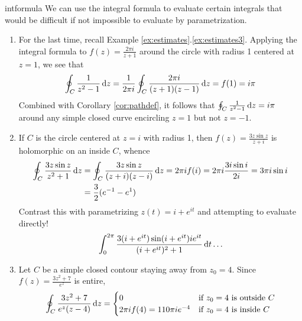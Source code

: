 \goodbreak






\begin{examples}{}{intformula}
	We can use the integral formula to evaluate certain integrals that would be difficult if not impossible to evaluate by parametrization.
	\begin{enumerate}
	  \item For the last time, recall Example \ref*{ex:estimates}.\ref{ex:estimates3}. Applying the integral formula to $f(z)=\frac{2\pi i}{z+1}$ around the circle with radius 1 centered at $z=1$, we see that
  	\[
  		\oint_C \frac 1{z^2-1}\,{\mathrm{d} z} =\frac 1{2\pi i}\oint_C \frac{2\pi i}{(z+1)(z-1)}\,{\mathrm{d} z} =f(1) =i\pi 
  	\]
  	Combined with Corollary \ref{cor:pathdef}, it follows that $\oint_C \frac 1{z^2-1}\,{\mathrm{d} z} =i\pi$ around any simple closed curve encircling $z=1$ but not $z=-1$.
	  
	  \item If $C$ is the circle centered at $z=i$ with radius 1, then $f(z)=\frac{3z\sin z}{z+i}$ is holomorphic on an inside $C$, whence
	  \begin{align*}
	  	\oint_C\frac{3z\sin z}{z^2+1}\,{\mathrm{d} z} 
	  	&=\oint_C\frac{3z\sin z}{(z+i)(z-i)}\,{\mathrm{d} z}
	  	=2\pi if(i)
	  	=2\pi i\frac{3i\sin i}{2i}
	  	=3\pi i\sin i\\
	  	&=\frac 32(e^{-1}-e^1)
	  \end{align*}
	  Contrast this with parametrizing $z(t)=i+e^{it}$ and attempting to evaluate directly!
 	  \[
 	  	\int_0^{2\pi}\frac{3(i+e^{it})\sin(i+e^{it})ie^{it}}{(i+e^{it})^2+1}\,{\mathrm{d} t}\ldots
	  \]
	  
	  \item Let $C$ be a simple closed contour staying away from $z_0=4$. Since $f(z)=\frac{3z^2+7}{e^z}$ is entire,
	  \[
	  	\oint_C\frac{3z^2+7}{e^z(z-4)}\,{\mathrm{d} z}=
	  	\begin{cases}
	  		0&\text{if $z_0=4$ is outside $C$}\\
	  		2\pi if(4)=110\pi ie^{-4}&\text{if $z_0=4$ is inside $C$}
	  	\end{cases}
	  \]
	  

\end{enumerate}
\end{examples}
